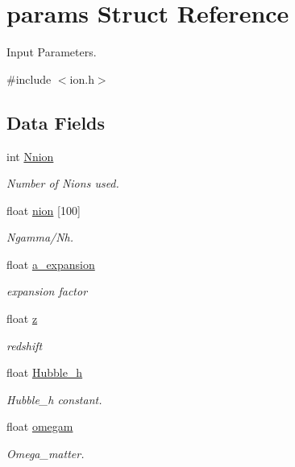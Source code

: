\hypertarget{structparams}{\section{params Struct Reference}
\label{structparams}
}


Input Parameters.  




{\ttfamily \#include $<$ion.\+h$>$}

\subsection*{Data Fields}
\begin{DoxyCompactItemize}
\item 
int \hyperlink{structparams_ab6d8d0b2c7ee385271e90e51818623bc}{Nnion}
\begin{DoxyCompactList}\small\item\em Number of Nions used. \end{DoxyCompactList}\item 
float \hyperlink{structparams_adad540bcd9d58ccb6cf0dfa257febb93}{nion} \mbox{[}100\mbox{]}
\begin{DoxyCompactList}\small\item\em Ngamma/\+Nh. \end{DoxyCompactList}\item 
float \hyperlink{structparams_ab8ae1614d88a1fdcded37c8573053e9c}{a\+\_\+expansion}
\begin{DoxyCompactList}\small\item\em expansion factor \end{DoxyCompactList}\item 
float \hyperlink{structparams_af73583b1e980b0aa03f9884812e9fd4d}{z}
\begin{DoxyCompactList}\small\item\em redshift \end{DoxyCompactList}\item 
float \hyperlink{structparams_a341cbdda601613d5625f64bb60871f69}{Hubble\+\_\+h}
\begin{DoxyCompactList}\small\item\em Hubble\+\_\+h constant. \end{DoxyCompactList}\item 
float \hyperlink{structparams_a1143ccc333b13b81d68f112fc1122acd}{omegam}
\begin{DoxyCompactList}\small\item\em Omega\+\_\+matter. \end{DoxyCompactList}\item 

\end{DoxyCompactItemize}
